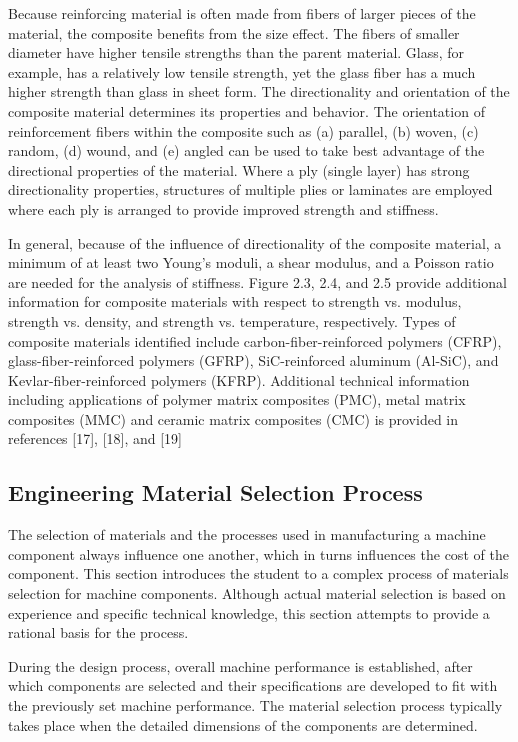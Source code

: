 \documentclass[a4paper,openany,nobib]{tufte-book}
\begin{document}
Because reinforcing material is often made from fibers of larger pieces
of the material, the composite benefits from the size effect. The fibers
of smaller diameter have higher tensile strengths than the parent
material. Glass, for example, has a relatively low tensile strength, yet
the glass fiber has a much higher strength than glass in sheet form. The
directionality and orientation of the composite material determines its
properties and behavior. The orientation of reinforcement fibers within
the composite such as (a) parallel, (b) woven, (c) random, (d) wound,
and (e) angled can be used to take best advantage of the directional
properties of the material. Where a ply (single layer) has strong
directionality properties, structures of multiple plies or laminates are
employed where each ply is arranged to provide improved strength and
stiffness.

In general, because of the influence of directionality of the composite
material, a minimum of at least two Young's moduli, a shear modulus, and
a Poisson ratio are needed for the analysis of stiffness. Figure 2.3,
2.4, and 2.5 provide additional information for composite materials with
respect to strength vs. modulus, strength vs. density, and strength vs.
temperature, respectively. Types of composite materials identified
include carbon-fiber-reinforced polymers (CFRP), glass-fiber-reinforced
polymers (GFRP), SiC-reinforced aluminum (Al-SiC), and
Kevlar-fiber-reinforced polymers (KFRP). Additional technical
information including applications of polymer matrix composites (PMC),
metal matrix composites (MMC) and ceramic matrix composites (CMC) is
provided in references [17], [18], and [19]

\subsection{Engineering Material Selection Process}
\label{engineering-material-selection-process}
The selection of materials and the processes used in manufacturing a
machine component always influence one another, which in turns
influences the cost of the component. This section introduces the
student to a complex process of materials selection for machine
components. Although actual material selection is based on experience
and specific technical knowledge, this section attempts to provide a
rational basis for the process.

During the design process, overall machine performance is established,
after which components are selected and their specifications are
developed to fit with the previously set machine performance. The
material selection process typically takes place when the detailed
dimensions of the components are determined.
\end{document}
